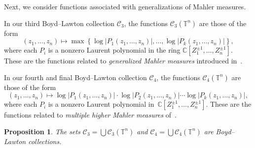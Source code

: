\documentclass[12pt]{amsart}
\theoremstyle{plain}
\newtheorem{proposition}[theorem]{Proposition}
\theoremstyle{definition}
\theoremstyle{remark}
\numberwithin{theorem}{section}
\numberwithin{equation}{section} %
\newcommand{\bC}{{\mathbb{C}}}
\newcommand{\mc}{\mathcal}
\newcommand{\torus}{{\mathbb{T}}}
\begin{document}
Next, we consider functions associated with generalizations of Mahler measures.

In our third Boyd--Lawton collection $\mc C_3$, the functions $\mc C_3(\torus^n)$
are those of the form
$$
(z_1, \ldots, z_n) \mapsto  \max \left\{ 
    \log | P_1(z_1, \ldots, z_n) |, \ldots, \log| P_k(z_1, \ldots, z_n)| 
    \right\},
$$
where each $P_i$ is a nonzero  Laurent polynomial in the ring  $\bC[Z^{\pm 1}_1, \ldots, Z^{\pm 1}_n]$.
These are the functions related to \emph{generalized Mahler measures} introduced
in~\cite{GonOyanagi2004}.

In our fourth and final Boyd--Lawton collection $\mc C_4$, the functions $\mc C_4(\torus^n)$
are those of the form
$$
(z_1, \ldots, z_n) \mapsto  
    \log | P_1(z_1, \ldots, z_n) | \cdot \log | P_2(z_1, \ldots, z_n) | \cdots \log| P_k(z_1, \ldots, z_n)| ,
$$
where each $P_i$ is a nonzero  Laurent polynomial in~$\bC[Z^{\pm 1}_1, \ldots, Z^{\pm 1}_n]$.
These are the functions related to \emph{multiple higher Mahler measures} of~\cite{Kurokawa2008}.


\begin{proposition} \label{prop: C_3}
The sets $\mc C_3 = \bigcup \mc C_3 (\torus^n)$ and $\mc C_4 = \bigcup \mc C_4 (\torus^n)$ are Boyd--Lawton collections.
\end{proposition}
\end{document}
